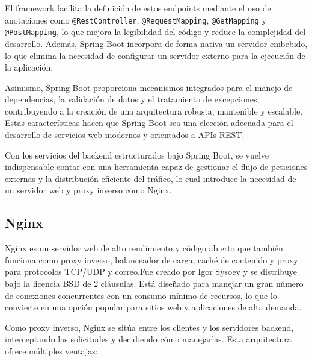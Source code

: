\documentclass{article}
\begin{document}
El framework facilita la definición de estos endpoints mediante el uso de anotaciones como \texttt{@RestController}, \texttt{@RequestMapping}, \texttt{@GetMapping} y \texttt{@PostMapping}, lo que mejora la legibilidad del código y reduce la complejidad del desarrollo. Además, Spring Boot incorpora de forma nativa un servidor embebido, lo que elimina la necesidad de configurar un servidor externo para la ejecución de la aplicación.

Asimismo, Spring Boot proporciona mecanismos integrados para el manejo de dependencias, la validación de datos y el tratamiento de excepciones, contribuyendo a la creación de una arquitectura robusta, mantenible y escalable. Estas características hacen que Spring Boot sea una elección adecuada para el desarrollo de servicios web modernos y orientados a APIs REST.

Con los servicios del backend estructurados bajo Spring Boot, se vuelve indispensable contar con una herramienta capaz de gestionar el flujo de peticiones externas y la distribución eficiente del tráfico, lo cual introduce la necesidad de un servidor web y proxy inverso como Nginx.

\subsection{Nginx}

Nginx\cite{nginx} es un servidor web de alto rendimiento y código abierto que también funciona como proxy inverso, balanceador de carga, caché de contenido y proxy para protocolos TCP/UDP y correo.Fue creado por Igor Sysoev y se distribuye bajo la licencia BSD de 2 cláusulas. Está diseñado para manejar un gran número de conexiones concurrentes con un consumo mínimo de recursos, lo que lo convierte en una opción popular para sitios web y aplicaciones de alta demanda.

Como proxy inverso, Nginx se sitúa entre los clientes y los servidores backend, interceptando las solicitudes y decidiendo cómo manejarlas. Esta arquitectura ofrece múltiples ventajas:
\end{document}
